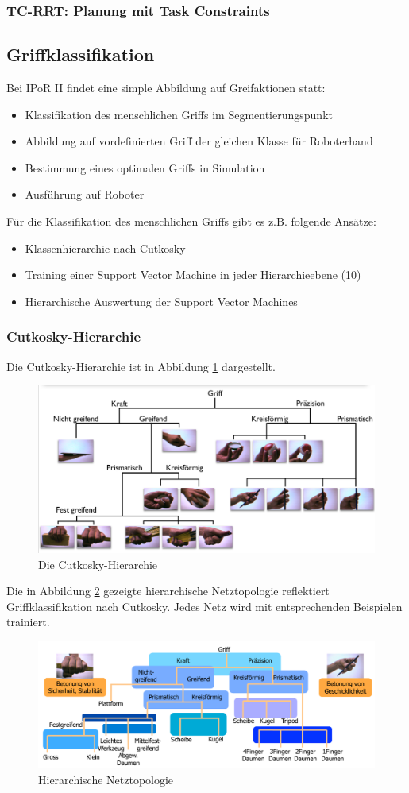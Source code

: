 \subsubsection*{TC-RRT: Planung mit Task Constraints}
\subsection{Griffklassifikation}
Bei IPoR II findet eine simple Abbildung auf Greifaktionen statt:
\begin{itemize}
\item Klassifikation des menschlichen Griffs im Segmentierungspunkt
\item Abbildung auf vordefinierten Griff der gleichen Klasse für Roboterhand
\item Bestimmung eines optimalen Griffs in Simulation
\item Ausführung auf Roboter
\end{itemize}
Für die Klassifikation des menschlichen Griffs gibt es z.B. folgende Ansätze:
\begin{itemize}
\item Klassenhierarchie nach Cutkosky
\item Training einer Support Vector Machine in jeder Hierarchieebene (10)
\item Hierarchische Auswertung der Support Vector Machines
\end{itemize}
\subsubsection*{Cutkosky-Hierarchie}
Die Cutkosky-Hierarchie ist in Abbildung \ref{fig:ch04_cuthie} dargestellt.
\begin{figure}[ht]\centering 
\includegraphics[width=0.6\linewidth]{figures/ch04_cutkosky.png}
\caption{Die Cutkosky-Hierarchie}
\label{fig:ch04_cuthie}
\end{figure}
Die in Abbildung \ref{fig:ch04_netztopo} gezeigte hierarchische Netztopologie reflektiert Griffklassifikation nach Cutkosky. Jedes Netz wird mit entsprechenden Beispielen trainiert.
\begin{figure}[ht]\centering 
\includegraphics[width=0.6\linewidth]{figures/ch04_netztopo.png}
\caption{Hierarchische Netztopologie}
\label{fig:ch04_netztopo}
\end{figure}

